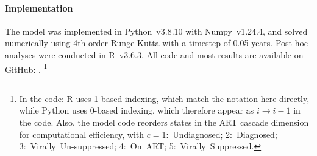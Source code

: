 \paragraph{Implementation}
The model was implemented in Python~v3.8.10 with Numpy~v1.24.4,
and solved numerically using 4th order Runge-Kutta \cite{Gill1951} with a timestep of 0.05 years.
Post-hoc analyses were conducted in R~v3.6.3.
All code and most results are available on GitHub:
.%
\footnote{\label{foot:code.note}%
  In the code: R uses 1-based indexing, which match the notation here directly,
  while Python uses 0-based indexing, which therefore appear as $i \rightarrow i-1$ in the code.
  Also, the model code reorders states in the ART cascade dimension for computational efficiency,
  with $c={}$1:~Undiagnosed; 2:~Diagnosed; 3:~Virally~Un-suppressed; 4:~On~ART; 5:~Virally~Suppressed.}
